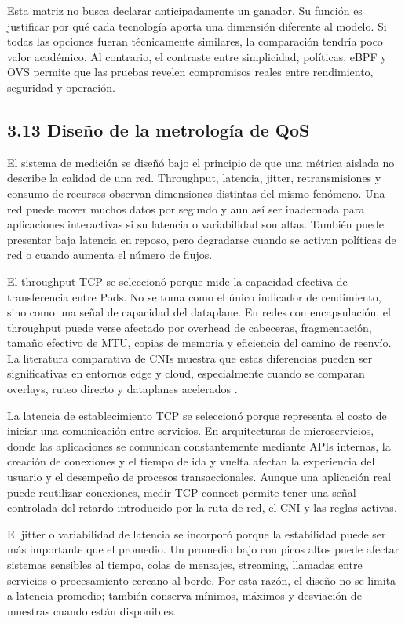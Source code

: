 Esta matriz no busca declarar anticipadamente un ganador. Su función es justificar por qué cada tecnología aporta una dimensión diferente al modelo. Si todas las opciones fueran técnicamente similares, la comparación tendría poco valor académico. Al contrario, el contraste entre simplicidad, políticas, eBPF y OVS permite que las pruebas revelen compromisos reales entre rendimiento, seguridad y operación.

\subsection{3.13 Diseño de la metrología de QoS}

El sistema de medición se diseñó bajo el principio de que una métrica aislada no describe la calidad de una red. Throughput, latencia, jitter, retransmisiones y consumo de recursos observan dimensiones distintas del mismo fenómeno. Una red puede mover muchos datos por segundo y aun así ser inadecuada para aplicaciones interactivas si su latencia o variabilidad son altas. También puede presentar baja latencia en reposo, pero degradarse cuando se activan políticas de red o cuando aumenta el número de flujos.

El throughput TCP se seleccionó porque mide la capacidad efectiva de transferencia entre Pods. No se toma como el único indicador de rendimiento, sino como una señal de capacidad del dataplane. En redes con encapsulación, el throughput puede verse afectado por overhead de cabeceras, fragmentación, tamaño efectivo de MTU, copias de memoria y eficiencia del camino de reenvío. La literatura comparativa de CNIs muestra que estas diferencias pueden ser significativas en entornos edge y cloud, especialmente cuando se comparan overlays, ruteo directo y dataplanes acelerados \cite{ref7,ref8}.

La latencia de establecimiento TCP se seleccionó porque representa el costo de iniciar una comunicación entre servicios. En arquitecturas de microservicios, donde las aplicaciones se comunican constantemente mediante APIs internas, la creación de conexiones y el tiempo de ida y vuelta afectan la experiencia del usuario y el desempeño de procesos transaccionales. Aunque una aplicación real puede reutilizar conexiones, medir TCP connect permite tener una señal controlada del retardo introducido por la ruta de red, el CNI y las reglas activas.

El jitter o variabilidad de latencia se incorporó porque la estabilidad puede ser más importante que el promedio. Un promedio bajo con picos altos puede afectar sistemas sensibles al tiempo, colas de mensajes, streaming, llamadas entre servicios o procesamiento cercano al borde. Por esta razón, el diseño no se limita a latencia promedio; también conserva mínimos, máximos y desviación de muestras cuando están disponibles.

